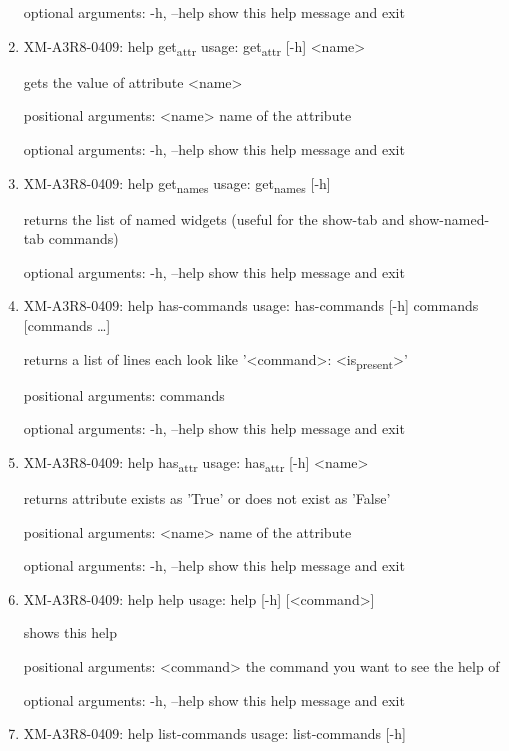 \documentclass[11pt]{article}
\begin{document}
\begin{enumerate}
optional arguments:
  -h, --help  show this help message and exit

\item XM-A3R8-0409: help get\textsubscript{attr}
\label{sec:org8ff5c16}
usage: get\textsubscript{attr} [-h] <name>

gets the value of attribute <name>

positional arguments:
  <name>      name of the attribute

optional arguments:
  -h, --help  show this help message and exit

\item XM-A3R8-0409: help get\textsubscript{names}
\label{sec:org213255c}
usage: get\textsubscript{names} [-h]

returns the list of named widgets (useful for the show-tab and show-named-tab
commands)

optional arguments:
  -h, --help  show this help message and exit

\item XM-A3R8-0409: help has-commands
\label{sec:org1d63f17}
usage: has-commands [-h] commands [commands \ldots{}]

returns a list of lines each look like '<command>: <is\textsubscript{present}>'

positional arguments:
  commands

optional arguments:
  -h, --help  show this help message and exit

\item XM-A3R8-0409: help has\textsubscript{attr}
\label{sec:orgc73260b}
usage: has\textsubscript{attr} [-h] <name>

returns attribute exists as 'True' or does not exist as 'False'

positional arguments:
  <name>      name of the attribute

optional arguments:
  -h, --help  show this help message and exit

\item XM-A3R8-0409: help help
\label{sec:org93230c6}
usage: help [-h] [<command>]

shows this help

positional arguments:
  <command>   the command you want to see the help of

optional arguments:
  -h, --help  show this help message and exit

\item XM-A3R8-0409: help list-commands
\label{sec:orge442137}
usage: list-commands [-h]


\end{enumerate}
\end{document}
